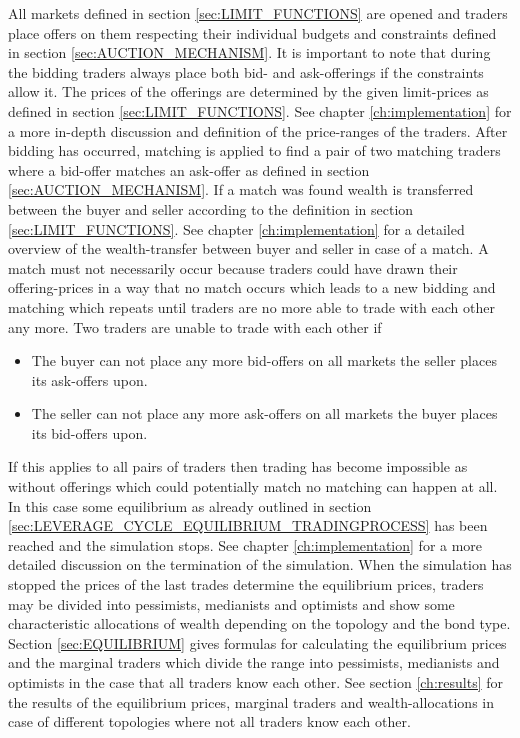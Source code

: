 \documentclass[../Bachelorarbeit.tex]{subfiles}
\begin{document}
All markets defined in section \ref{sec:LIMIT_FUNCTIONS} are opened and traders place offers on them respecting their individual budgets and constraints defined in section \ref{sec:AUCTION_MECHANISM}. It is important to note that during the bidding traders always place both bid- and ask-offerings if the constraints allow it. The prices of the offerings are determined by the given limit-prices as defined in section \ref{sec:LIMIT_FUNCTIONS}. See chapter \ref{ch:implementation} for a more in-depth discussion and definition of the price-ranges of the traders. After bidding has occurred, matching is applied to find a pair of two matching traders where a bid-offer matches an ask-offer as defined in section \ref{sec:AUCTION_MECHANISM}. If a match was found wealth is transferred between the buyer and seller according to the definition in section \ref{sec:LIMIT_FUNCTIONS}. See chapter \ref{ch:implementation} for a detailed overview of the wealth-transfer between buyer and seller in case of a match. A match must not necessarily occur because traders could have drawn their offering-prices in a way that no match occurs which leads to a new bidding and matching which repeats until traders are no more able to trade with each other any more. Two traders are unable to trade with each other if

\begin{itemize}
\item The buyer can not place any more bid-offers on all markets the seller places its ask-offers upon.
\item The seller can not place any more ask-offers on all markets the buyer places its bid-offers upon.
\end{itemize}

If this applies to all pairs of traders then trading has become impossible as without offerings which could potentially match no matching can happen at all. In this case some equilibrium as already outlined in section \ref{sec:LEVERAGE_CYCLE_EQUILIBRIUM_TRADINGPROCESS} has been reached and the simulation stops. See chapter \ref{ch:implementation} for a more detailed discussion on the termination of the simulation. When the simulation has stopped the prices of the last trades determine the equilibrium prices, traders may be divided into pessimists, medianists and optimists and show some characteristic allocations of wealth depending on the topology and the bond type. Section \ref{sec:EQUILIBRIUM} gives formulas for calculating the equilibrium prices and the marginal traders which divide the range into pessimists, medianists and optimists in the case that all traders know each other. See section \ref{ch:results} for the results of the equilibrium prices, marginal traders and wealth-allocations in case of different topologies where not all traders know each other.
\end{document}
